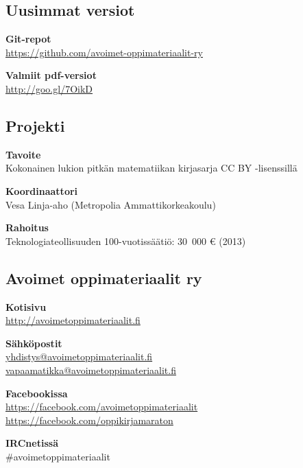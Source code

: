 \subsection*{Uusimmat versiot}

\textbf{Git-repot} \\
\url{https://github.com/avoimet-oppimateriaalit-ry}

\textbf{Valmiit pdf-versiot} \\
\url{http://goo.gl/7OikD}

\subsection*{Projekti}

\textbf{Tavoite} \\
Kokonainen lukion pitkän matematiikan kirjasarja CC BY -lisenssillä

\textbf{Koordinaattori} \\
Vesa Linja-aho (Metropolia Ammattikorkeakoulu)

\textbf{Rahoitus} \\
Teknologiateollisuuden 100-vuotissäätiö: 30~000 \euro \; (2013)

\subsection*{Avoimet oppimateriaalit ry}

\textbf{Kotisivu} \\
\url{http://avoimetoppimateriaalit.fi}

\textbf{Sähköpostit} \\
\href{mailto:yhdistys@avoimetoppimateriaalit.fi}{yhdistys@avoimetoppimateriaalit.fi} \\
\href{mailto:vapaamatikka@avoimetoppimateriaalit.fi}{vapaamatikka@avoimetoppimateriaalit.fi}

\textbf{Facebookissa} \\
\url{https://facebook.com/avoimetoppimateriaalit} \\
\url{https://facebook.com/oppikirjamaraton}

\textbf{IRCnetissä} \\
\#avoimetoppimateriaalit
